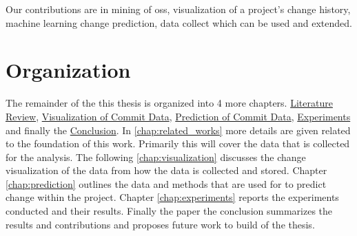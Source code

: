 Our contributions are in mining of \gls{oss}, visualization of a project's change history, machine learning change prediction, data collect which can be used and extended.

\section{Organization}

The remainder of the this thesis is organized into 4 more chapters. \hyperref[chap:related_works]{Literature Review}, \hyperref[chap:visualization]{Visualization of Commit Data}, \hyperref[chap:prediction]{Prediction of Commit Data}, \hyperref[chap:experiments]{Experiments} and finally the \hyperref[chap:conclusions]{Conclusion}. In \autoref{chap:related_works} more details are given related to the foundation of this work. Primarily this will cover the data that is collected for the analysis. The following \autoref{chap:visualization} discusses the change visualization of the data from how the data is collected and stored. Chapter \autoref{chap:prediction} outlines the data and methods that are used for to predict change within the project. Chapter \ref{chap:experiments} reports the experiments conducted and their results. Finally the paper the conclusion summarizes the results and contributions and proposes future work to build of the thesis.